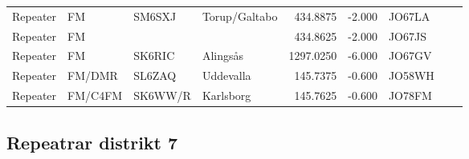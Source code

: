 \begin{longtable}{llllrrlcl}
	Repeater & FM              & SM6SXJ   & Torup/Galtabo         &   434.8875 &   -2.000 & JO67LA &  &  \\
	Repeater & FM              &          &                       &   434.8625 &   -2.000 & JO67JS &  &  \\
	Repeater & FM              & SK6RIC   & Alingsås              &  1297.0250 &   -6.000 & JO67GV &  &  \\
	Repeater & FM/DMR          & SL6ZAQ   & Uddevalla             &   145.7375 &   -0.600 & JO58WH &  &  \\
	Repeater & FM/C4FM         & SK6WW/R  & Karlsborg             &   145.7625 &   -0.600 & JO78FM &  &
\end{longtable}

\subsection{Repeatrar distrikt 7}


